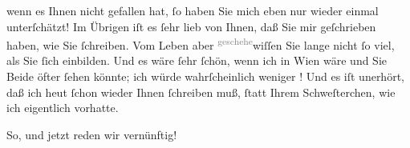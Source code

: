                wenn es Ihnen  nicht gefallen hat,{ }ſo haben Sie mich eben nur wieder einmal unterſchätzt! Im
               Übrigen iſt es ſehr lieb
               von Ihnen, daß Sie mir geſchrieben haben, wie Sie{ }ſchreiben. Vom Leben aber {\pb}\substVorne{}\textsuperscript{\textcolor{gray}{geschehe}}\substDazwischen{}wiſſen\substHinten{} Sie lange nicht{ }ſo viel, als Sie{ }ſich einbilden. Und es wäre{ }ſehr{ }ſchön,
               wenn ich in Wien wäre und Sie Beide öfter{ }ſehen könnte; ich würde
               wahrſcheinlich weniger \label{K_L03525-4v}\label{K_L03525-4}! Und es iſt unerhört, daß ich heut{ }ſchon
               wieder Ihnen{ }ſchreiben muß,{ }ſtatt Ihrem Schweſterchen, wie ich eigentlich vorhatte.\pend
           
\pstart
           So, und jetzt reden wir vernünftig!\pend
           
